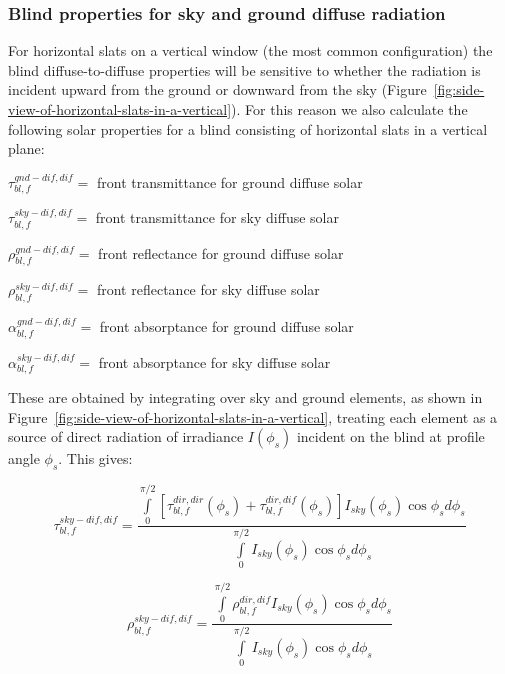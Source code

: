 \subsubsection{Blind properties for sky and ground diffuse radiation}\label{blind-properties-for-sky-and-ground-diffuse-radiation}

For horizontal slats on a vertical window (the most common configuration) the blind diffuse-to-diffuse properties will be sensitive to whether the radiation is incident upward from the ground or downward from the sky (Figure~\ref{fig:side-view-of-horizontal-slats-in-a-vertical}). For this reason we also calculate the following solar properties for a blind consisting of horizontal slats in a vertical plane:

\(\tau_{bl,f}^{gnd - dif,dif} = {\mathrm{ }}\) front transmittance for ground diffuse solar

\(\tau_{bl,f}^{sky - dif,dif} = {\mathrm{ }}\) front transmittance for sky diffuse solar

$\rho_{bl,f}^{gnd - dif,dif} = $ front reflectance for ground diffuse solar

\(\rho_{bl,f}^{sky - dif,dif} = {\mathrm{ }}\) front reflectance for sky diffuse solar

\(\alpha_{bl,f}^{gnd - dif,dif} = {\mathrm{ }}\) front absorptance for ground diffuse solar

\(\alpha_{bl,f}^{sky - dif,dif} = {\mathrm{ }}\) front absorptance for sky diffuse solar

These are obtained by integrating over sky and ground elements, as shown in Figure~\ref{fig:side-view-of-horizontal-slats-in-a-vertical}, treating each element as a source of direct radiation of irradiance \(I({\phi_s})\) incident on the blind at profile angle \({\phi_s}\). This gives:

\begin{equation}
\tau_{bl,f}^{sky - dif,dif} = \frac{{\int\limits_0^{\pi /2} {\left[ {\tau_{bl,f}^{dir,dir}({\phi_s}) + \tau_{bl,f}^{dir,dif}({\phi_s})} \right]{I_{sky}}({\phi_s})\cos {\phi_s}d{\phi_s}} }}{{\int\limits_0^{\pi /2} {{I_{sky}}({\phi_s})\cos {\phi_s}d{\phi_s}} }}
\end{equation}

\begin{equation}
\rho_{bl,f}^{sky - dif,dif} = \frac{{\int\limits_0^{\pi /2} {\rho_{bl,f}^{dir,dif}{I_{sky}}({\phi_s})\cos {\phi_s}d{\phi_s}} }}{{\int\limits_0^{\pi /2} {{I_{sky}}({\phi_s})\cos {\phi_s}d{\phi_s}} }}
\end{equation}

